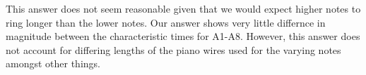 \documentclass[12pt]{article}
\begin{document}
\begin{enumerate}[a)]
        This answer does not seem reasonable given that we would expect higher notes to
        ring longer than the lower notes. Our answer shows very little differnce in
        magnitude between the characteristic times for A1-A8.
        However, this answer does not account for differing lengths of the piano wires
        used for the varying notes amongst other things.

\end{enumerate}




% 
% 

\end{document}
